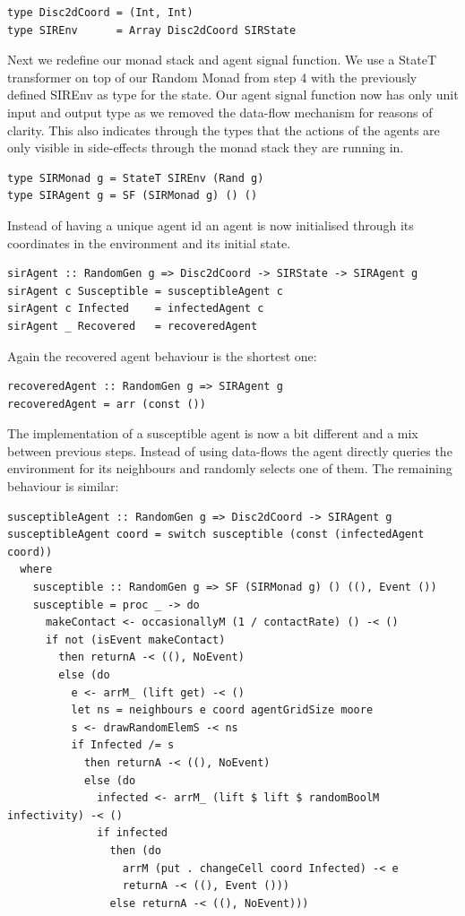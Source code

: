 \begin{verbatim}
type Disc2dCoord = (Int, Int)
type SIREnv      = Array Disc2dCoord SIRState
\end{verbatim}

Next we redefine our monad stack and agent signal function. We use a StateT transformer on top of our Random Monad from step 4 with the previously defined SIREnv as type for the state. Our agent signal function now has only unit input and output type as we removed the data-flow mechanism for reasons of clarity. This also indicates through the types that the actions of the agents are only visible in side-effects through the monad stack they are running in.

\begin{verbatim}
type SIRMonad g = StateT SIREnv (Rand g)
type SIRAgent g = SF (SIRMonad g) () ()
\end{verbatim}

Instead of having a unique agent id an agent is now initialised through its coordinates in the environment and its initial state. 

\begin{verbatim}
sirAgent :: RandomGen g => Disc2dCoord -> SIRState -> SIRAgent g
sirAgent c Susceptible = susceptibleAgent c
sirAgent c Infected    = infectedAgent c
sirAgent _ Recovered   = recoveredAgent
\end{verbatim}

Again the recovered agent behaviour is the shortest one:
\begin{verbatim}
recoveredAgent :: RandomGen g => SIRAgent g
recoveredAgent = arr (const ())
\end{verbatim}

The implementation of a susceptible agent is now a bit different and a mix between previous steps. Instead of using data-flows the agent directly queries the environment for its neighbours and randomly selects one of them. The remaining behaviour is similar:

\begin{verbatim}
susceptibleAgent :: RandomGen g => Disc2dCoord -> SIRAgent g
susceptibleAgent coord = switch susceptible (const (infectedAgent coord))
  where
    susceptible :: RandomGen g => SF (SIRMonad g) () ((), Event ())
    susceptible = proc _ -> do
      makeContact <- occasionallyM (1 / contactRate) () -< ()
      if not (isEvent makeContact)
        then returnA -< ((), NoEvent)
        else (do
          e <- arrM_ (lift get) -< ()
          let ns = neighbours e coord agentGridSize moore
          s <- drawRandomElemS -< ns
          if Infected /= s
            then returnA -< ((), NoEvent)
            else (do
              infected <- arrM_ (lift $ lift $ randomBoolM infectivity) -< ()
              if infected 
                then (do
                  arrM (put . changeCell coord Infected) -< e
                  returnA -< ((), Event ()))
                else returnA -< ((), NoEvent)))
\end{verbatim}

